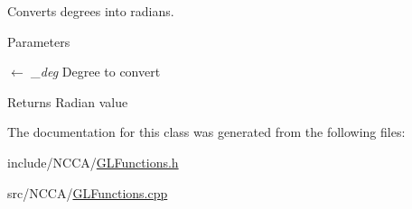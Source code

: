 Converts degrees into radians. 
\begin{DoxyParams}{Parameters}
\item[\mbox{$\leftarrow$} {\em \_\-deg}]Degree to convert \end{DoxyParams}
\begin{DoxyReturn}{Returns}
Radian value 
\end{DoxyReturn}


The documentation for this class was generated from the following files:\begin{DoxyCompactItemize}
\item 
include/NCCA/\hyperlink{GLFunctions_8h}{GLFunctions.h}\item 
src/NCCA/\hyperlink{GLFunctions_8cpp}{GLFunctions.cpp}\end{DoxyCompactItemize}
